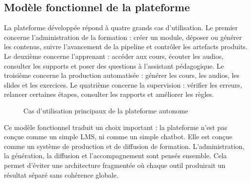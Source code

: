 \subsection{Modèle fonctionnel de la plateforme}

La plateforme développée répond à quatre grands cas d'utilisation. Le premier concerne
l'administration de la formation : créer un module, déposer ou générer les contenus,
suivre l'avancement de la pipeline et contrôler les artefacts produits. Le deuxième
concerne l'apprenant : accéder aux cours, écouter les audios, consulter les supports et
poser des questions à l'assistant pédagogique. Le troisième concerne la production
automatisée : générer les cours, les audios, les slides et les exercices. Le quatrième
concerne la supervision : vérifier les erreurs, relancer certaines étapes, consulter les
rapports et améliorer les règles.

\begin{figure}[h]
\centering
{}
\caption{Cas d'utilisation principaux de la plateforme autonome}
\end{figure}

Ce modèle fonctionnel traduit un choix important : la plateforme n'est pas conçue comme
un simple LMS, ni comme un simple chatbot. Elle est conçue comme un système de
production et de diffusion de formation. L'administration, la génération, la diffusion et
l'accompagnement sont pensés ensemble. Cela permet d'éviter une architecture fragmentée
où chaque outil produirait un résultat séparé sans cohérence globale.

